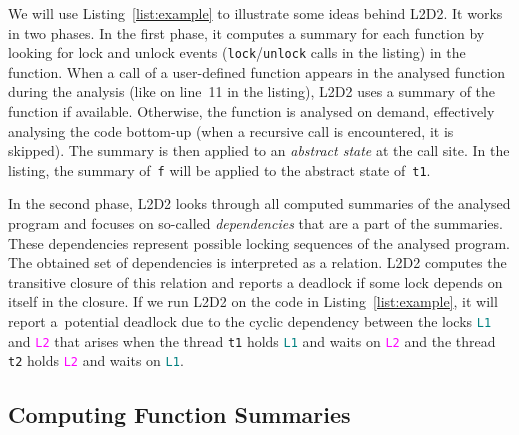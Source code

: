 \documentclass[runningheads]{llncs}
\newcommand{\LLDD}{\textsc{L2D2}\xspace} %
\begin{document}
We will use Listing~\ref{list:example} to illustrate some ideas behind \LLDD.
%
It works in two phases. In the first phase, it computes a summary for each
function by looking for lock and unlock events (\texttt{lock}/\texttt{unlock}
calls in the listing) in the function. When a call of a user-defined function
appears in the analysed function during the analysis (like on line~11 in the
listing), \LLDD uses a summary of the function if available. Otherwise, the
function is analysed on demand, effectively analysing the code bottom-up (when a
recursive call is encountered, it is skipped). The summary is then applied to an
\emph{abstract state} at the call site. In the listing, the summary
of~\texttt{f} will be applied to the abstract state of~\texttt{t1}.

In the second phase, \LLDD looks through all computed summaries of the analysed
program and focuses on so-called \emph{dependencies} that are a part of the
summaries. These dependencies represent possible locking sequences of the
analysed program. The obtained set of dependencies is interpreted as a relation.
\LLDD computes the transitive closure of this relation and reports a deadlock if
some lock depends on itself in the closure. If we run \LLDD on the code in
Listing~\ref{list:example}, it will report a~potential deadlock due to the
cyclic dependency between the locks \texttt{\textcolor{teal}{L1}} and
\texttt{\textcolor{magenta}{L2}} that arises when the thread \texttt{t1} holds
\texttt{\textcolor{teal}{L1}} and waits on \texttt{\textcolor{magenta}{L2}} and
the thread \texttt{t2} holds \texttt{\textcolor{magenta}{L2}} and waits on
\texttt{\textcolor{teal}{L1}}.

\vspace*{-4mm}\subsection{Computing Function Summaries}\vspace*{-2mm}
\label{sec:summaries}
\end{document}
